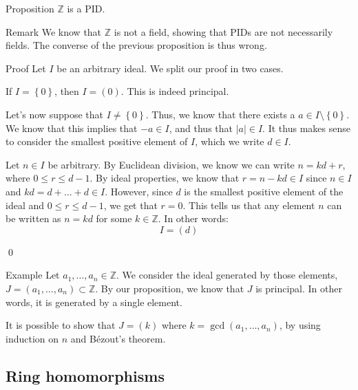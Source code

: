 \documentclass[a4paper]{article}
\begin{document}
\begin{parag}{Proposition}
    $\mathbb{Z}$ is a PID.

    \begin{subparag}{Remark}
        We know that $\mathbb{Z}$ is not a field, showing that PIDs are not necessarily fields. The converse of the previous proposition is thus wrong.
    \end{subparag}

    \begin{subparag}{Proof}
        Let $I$ be an arbitrary ideal. We split our proof in two cases.

        If $I = \left\{0\right\}$, then $I = \left(0\right)$. This is indeed principal.

        Let's now suppose that $I \neq \left\{0\right\}$. Thus, we know that there exists a $a \in I \setminus \left\{0\right\}$. We know that this implies that $-a \in I$, and thus that $\left|a\right| \in I$. It thus makes sense to consider the smallest positive element of $I$, which we write $d \in I$.

        Let $n \in I$ be arbitrary. By Euclidean division, we know we can write $n = kd + r$, where $0 \leq r \leq d - 1$. By ideal properties, we know that $r = n - kd \in I$ since $n \in I$ and $kd = d + \ldots + d \in I$. However, since $d$ is the smallest positive element of the ideal and $0 \leq r \leq d -1$, we get that $r = 0$. This tells us that any element $n$ can be written as $n = kd$ for some $k \in \mathbb{Z}$. In other words: 
        \[I = \left(d\right)\]

        \qed
    \end{subparag}
\end{parag}

\begin{parag}{Example}
    Let $a_1, \ldots, a_n \in \mathbb{Z}$. We consider the ideal generated by those elements, $J = \left(a_1, \ldots, a_n\right) \subset \mathbb{Z}$. By our proposition, we know that $J$ is principal. In other words, it is generated by a single element.

    It is possible to show that $J = \left(k\right)$ where $k = \gcd\left(a_1, \ldots, a_n\right)$, by using induction on $n$ and Bézout's theorem.
\end{parag}

\subsection{Ring homomorphisms}
\end{document}
